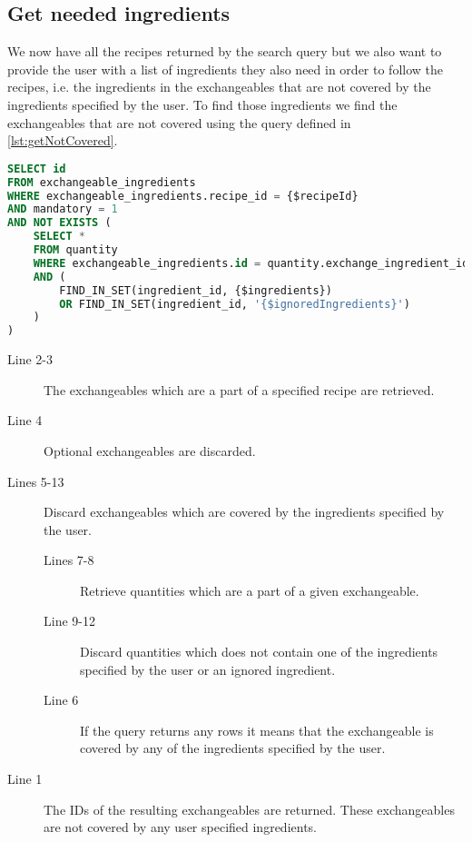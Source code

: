 \subsection*{Get needed ingredients}
We now have all the recipes returned by the search query but we also want to provide the user with a list of ingredients they also need in order to follow the recipes, i.e. the ingredients in the exchangeables that are not covered by the ingredients specified by the user. To find those ingredients we find the exchangeables that are not covered using the query defined in \autoref{lst:getNotCovered}.
\begin{lstlisting}[language=SQL, morekeywords={FIND_IN_SET}, float=h, label={lst:getNotCovered}, caption={Query to find the exchangeables that are not covered.}]
SELECT id
FROM exchangeable_ingredients
WHERE exchangeable_ingredients.recipe_id = {$recipeId}
AND mandatory = 1
AND NOT EXISTS (
    SELECT * 
    FROM quantity
    WHERE exchangeable_ingredients.id = quantity.exchange_ingredient_id
    AND (
    	FIND_IN_SET(ingredient_id, {$ingredients})
    	OR FIND_IN_SET(ingredient_id, '{$ignoredIngredients}')
    )
)
\end{lstlisting}
\begin{description}
\item[Line 2-3] The exchangeables which are a part of a specified recipe are retrieved.
\item[Line 4] Optional exchangeables are discarded.
\item[Lines 5-13] Discard exchangeables which are covered by the ingredients specified by the user.
	\begin{description}
	\item[Lines 7-8] Retrieve quantities which are a part of a given exchangeable.
	\item[Line 9-12] Discard quantities which does not contain one of the ingredients specified by the user or an ignored ingredient.
	\item[Line 6] If the query returns any rows it means that the exchangeable is covered by any of the ingredients specified by the user.
	\end{description}
\item[Line 1] The IDs of the resulting exchangeables are returned. These exchangeables are not covered by any user specified ingredients.
\end{description}


